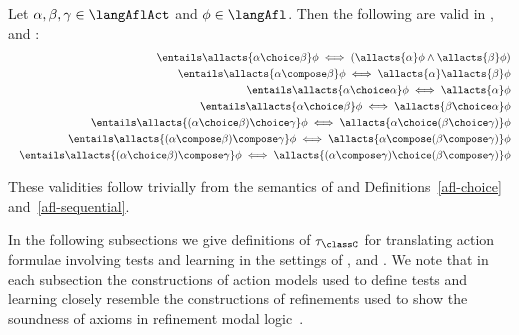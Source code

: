 \documentclass[twoside]{aiml14}
\begin{document}
  \begin{proposition}\label{afl-choice-sequential-validities}
      Let $\alpha, \beta, \gamma \in \langAflAct$ and $\phi \in \langAfl$. Then the following are valid in \logicAflK{}, \logicAflKFF{} and \logicAflS{}:
      \begin{eqnarray*}
          &&\entails \allacts{\alpha \choice \beta} \phi \iff (\allacts{\alpha} \phi \land \allacts{\beta} \phi) \label{afl-axiom-choice}\\
          &&\entails \allacts{\alpha \compose \beta} \phi \iff \allacts{\alpha} \allacts{\beta} \phi \label{afl-axiom-sequential}\\
          &&\entails \allacts{\alpha \choice \alpha} \phi \iff \allacts{\alpha} \phi\\
          &&\entails \allacts{\alpha \choice \beta} \phi \iff \allacts{\beta \choice \alpha} \phi\\
          &&\entails \allacts{(\alpha \choice \beta) \choice \gamma} \phi \iff \allacts{\alpha \choice (\beta \choice \gamma)} \phi\\
          &&\entails \allacts{(\alpha \compose \beta) \compose \gamma} \phi \iff \allacts{\alpha \compose (\beta \compose \gamma)} \phi\\
          &&\entails \allacts{(\alpha \choice \beta) \compose \gamma} \phi \iff \allacts{(\alpha \compose \gamma) \choice (\beta \compose \gamma)} \phi
      \end{eqnarray*}
  \end{proposition}

  These validities follow trivially from the semantics of \logicAaflC{} and Definitions~\ref{afl-choice} and~\ref{afl-sequential}.

  In the following subsections we give definitions of $\tau_\classC$ for
  translating action formulae involving tests and learning in the settings of
  \classK{}, \classKFF{} and \classS{}. We note that in each subsection the
  constructions of action models used to define tests and learning closely
  resemble the constructions of refinements used to show the soundness of
  axioms in refinement modal logic~\cite{bozzelli2012a,hales2012}.

  \subsection{\classK{}}
\end{document}
